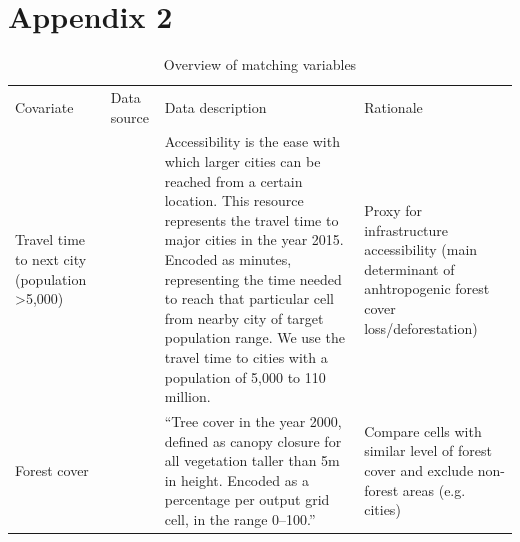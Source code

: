 \documentclass{article}
\begin{document}
\section*{Appendix 2}
\begin{table}[h]
\caption{Overview of matching variables}
\label{tab:matchvar}
\begin{tabular}{L{2cm}L{2cm}L{9cm}L{3cm}}
\toprule
Covariate  & Data source & Data description  & Rationale \\
Travel time to next city (population >5,000)                           & \cite{weiss2018global}                         & Accessibility is the ease with which larger cities can be reached from a certain location. This resource represents the travel time to major cities in the year 2015. Encoded as minutes, representing the time needed to reach that particular cell from nearby city of target population range. We use the travel time to cities with a population of 5,000 to 110 million.                                                   & Proxy for infrastructure accessibility (main determinant of anhtropogenic forest cover loss/deforestation) \\
Forest cover                                                           & \cite{hansen2013high}                         & ``Tree cover in the year 2000, defined as canopy closure for all vegetation taller than 5m in height. Encoded as a percentage per output grid cell, in the range 0–100.''                                                                                                                                                                                                                                                         & Compare cells with similar level of forest cover and exclude non-forest areas (e.g. cities)  \\


\end{tabular}
\end{table}
\end{document}
